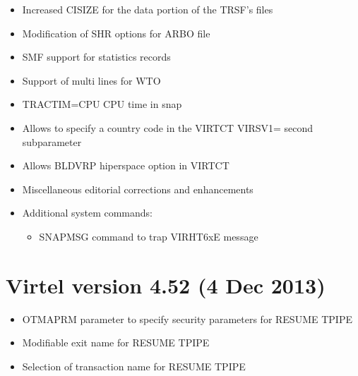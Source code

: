 \documentclass[letterpaper,10pt,english]{sphinxmanual}
\begin{document}
\sphinxAtStartPar
{}
\begin{itemize}
\item {} 
\sphinxAtStartPar
Increased CISIZE for the data portion of the TRSF’s files

\item {} 
\sphinxAtStartPar
Modification of SHR options for ARBO file

\item {} 
\sphinxAtStartPar
SMF support for statistics records

\item {} 
\sphinxAtStartPar
Support of multi lines for WTO

\item {} 
\sphinxAtStartPar
TRACTIM=CPU CPU time in snap

\item {} 
\sphinxAtStartPar
Allows to specify a country code in the VIRTCT VIRSV1= second
sub\sphinxhyphen{}parameter

\item {} 
\sphinxAtStartPar
Allows BLDVRP hiperspace option in VIRTCT

\item {} 
\sphinxAtStartPar
Miscellaneous editorial corrections and enhancements

\item {} 
\sphinxAtStartPar
Additional system commands:
\begin{itemize}
\item {} 
\sphinxAtStartPar
SNAPMSG command to trap VIRHT6xE message

\end{itemize}

\end{itemize}


\section{Virtel version 4.52 (4 Dec 2013)}
\label{\detokenize{Installation_Guide:virtel-version-4-52-4-dec-2013}}
\sphinxAtStartPar
{}
\begin{itemize}
\item {} 
\sphinxAtStartPar
OTMAPRM parameter to specify security parameters for RESUME TPIPE

\item {} 
\sphinxAtStartPar
Modifiable exit name for RESUME TPIPE

\item {} 
\sphinxAtStartPar
Selection of transaction name for RESUME TPIPE

\end{itemize}
\end{document}
